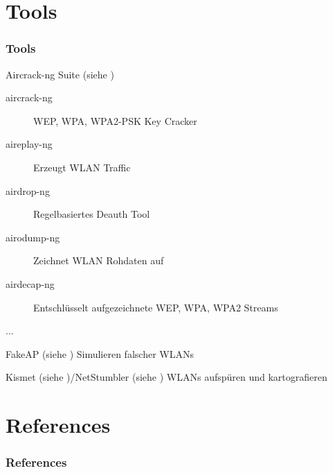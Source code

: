 \documentclass{beamer}
\begin{document}
\section{Tools}
\begin{frame}
\frametitle{Tools}
\begin{block}{Aircrack-ng Suite (siehe \cite{aircrack})}
	\begin{description}
		\item[aircrack-ng] WEP, WPA, WPA2-PSK Key Cracker
		\item[aireplay-ng] Erzeugt WLAN Traffic
		\item[airdrop-ng] Regelbasiertes Deauth Tool
		\item[airodump-ng] Zeichnet WLAN Rohdaten auf
		\item[airdecap-ng] Entschlüsselt aufgezeichnete WEP, WPA, WPA2 Streams
		\item[...]
	\end{description}
\end{block}
\begin{block}{FakeAP (siehe \cite{fakeap})}
Simulieren falscher WLANs
\end{block}
\begin{block}{Kismet (siehe \cite{kismet})/NetStumbler (siehe \cite{netstumbler})}
WLANs aufspüren und kartografieren
\end{block}
\end{frame}

\section{References}
\begin{frame}[allowframebreaks]
\frametitle{References}


\end{frame}
\end{document}
